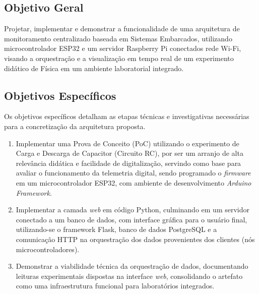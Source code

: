 \subsection{Objetivo Geral}
Projetar, implementar e demonstrar a funcionalidade de uma arquitetura de monitoramento centralizado baseada em Sistemas Embarcados, utilizando microcontrolador ESP32 e um servidor Raspberry Pi conectados rede Wi-Fi, visando a orquestração e a visualização em tempo real de um experimento didático de Física em um ambiente laboratorial integrado.

\subsection{Objetivos Específicos}
Os objetivos específicos detalham as etapas técnicas e investigativas necessárias para a concretização da arquitetura proposta.

\begin{enumerate}
    \item Implementar uma Prova de Conceito (PoC) utilizando o experimento de Carga e Descarga de Capacitor (Circuito RC), por ser um arranjo de alta relevância didática e facilidade de digitalização, servindo como base para avaliar o funcionamento da telemetria digital, sendo programado o \textit{firmware} em um microcontrolador ESP32, com ambiente de desenvolvimento \textit{Arduino Framework}.
    \item Implementar a camada \textit{web} em código Python, culminando em um servidor conectado a um banco de dados, com interface gráfica para o usuário final, utilizando-se o framework Flask, banco de dados PostgreSQL e a comunicação HTTP na orquestração dos dados provenientes dos clientes (nós microcontroladores).
    \item Demonstrar a viabilidade técnica da orquestração de dados, documentando leituras experimentais dispostas na interface \textit{web}, consolidando o artefato como uma infraestrutura funcional para laboratórios integrados.
\end{enumerate}
